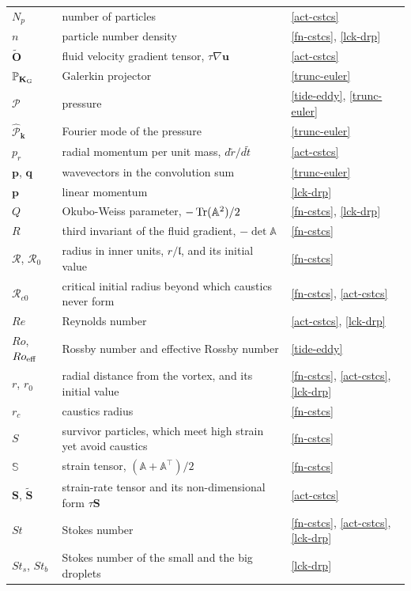 \begin{longtable}{@{}p{}p{}p{}@{}}
$N_p$ & number of particles & \ref{act-cstcs} \\
$n$ & particle number density & \ref{fn-cstcs}, \ref{lck-drp} \\
$\tilde{\mathbf{O}}$ & fluid velocity gradient tensor, $\tau\nabla\boldsymbol{u}$ & \ref{act-cstcs} \\
$\mathbb{P}_{\mathbf{K}_{\rm G}}$ & Galerkin projector & \ref{trunc-euler} \\
$\mathcal{P}$ & pressure & \ref{tide-eddy}, \ref{trunc-euler} \\
$\widehat{\mathcal{P}}_{\mathbf{k}}$ & Fourier mode of the pressure & \ref{trunc-euler} \\
$p_r$ & radial momentum per unit mass, $d\tilde{r}/d\tilde{t}$ & \ref{act-cstcs} \\
$\mathbf{p}$, $\mathbf{q}$ & wavevectors in the convolution sum & \ref{trunc-euler} \\
$\boldsymbol{p}$ & linear momentum & \ref{lck-drp} \\
$Q$ & Okubo-Weiss parameter, $-\operatorname{Tr}(\mathbb{A}^2)/2$ & \ref{fn-cstcs}, \ref{lck-drp} \\
$R$ & third invariant of the fluid gradient, $-\det\mathbb{A}$ & \ref{fn-cstcs} \\
$\mathcal{R}$, $\mathcal{R}_0$ & radius in inner units, $r/\mathfrak{l}$, and its initial value & \ref{fn-cstcs} \\
$\mathcal{R}_{c0}$ & critical initial radius beyond which caustics never form & \ref{fn-cstcs}, \ref{act-cstcs} \\
$Re$ & Reynolds number & \ref{act-cstcs}, \ref{lck-drp} \\
$Ro$, $Ro_{\rm eff}$ & Rossby number and effective Rossby number & \ref{tide-eddy} \\
$r$, $r_0$ & radial distance from the vortex, and its initial value & \ref{fn-cstcs}, \ref{act-cstcs}, \ref{lck-drp} \\
$r_c$ & caustics radius & \ref{fn-cstcs} \\
$S$ & survivor particles, which meet high strain yet avoid caustics & \ref{fn-cstcs} \\
$\mathbb{S}$ & strain tensor, $(\mathbb{A}+\mathbb{A}^{\!\top})/2$ & \ref{fn-cstcs} \\
$\mathbf{S}$, $\tilde{\mathbf{S}}$ & strain-rate tensor and its non-dimensional form $\tau\mathbf{S}$ & \ref{act-cstcs} \\
$St$ & Stokes number & \ref{fn-cstcs}, \ref{act-cstcs}, \ref{lck-drp} \\
$St_s$, $St_b$ & Stokes number of the small and the big droplets & \ref{lck-drp} \\

\end{longtable}
